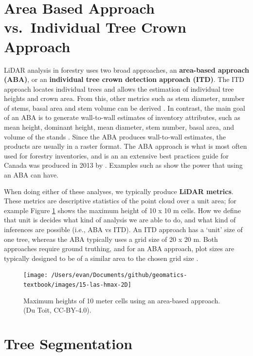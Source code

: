 \documentclass[
]{book}
\begin{document}
\hypertarget{area-based-approach-vs.-individual-tree-crown-approach}{%
\section{Area Based Approach vs.~Individual Tree Crown Approach}\label{area-based-approach-vs.-individual-tree-crown-approach}}

LiDAR analysis in forestry uses two broad approaches, an \textbf{area-based approach (ABA)}, or an \textbf{individual tree crown detection approach (ITD)}. The ITD approach locates individual trees and allows the estimation of individual tree heights and crown area. From this, other metrics such as stem diameter, number of stems, basal area and stem volume can be derived \citep{Hyyppa1999}. In contrast, the main goal of an ABA is to generate wall-to-wall estimates of inventory attributes, such as mean height, dominant height, mean diameter, stem number, basal area, and volume of the stands \citep{Næsset2002}. Since the ABA produces wall-to-wall estimates, the products are usually in a raster format. The ABA approach is what is most often used for forestry inventories, and is an an extensive best practices guide for Canada was produced in 2013 by \citet{White2013}. Examples such as \citet{Tompalski2019} show the power that using an ABA can have.

When doing either of these analyses, we typically produce \textbf{LiDAR metrics}. These metrics are descriptive statistics of the point cloud over a unit area; for example Figure \ref{fig:15-las-hmax-2D} shows the maximum height of 10 x 10 m cells. How we define that unit is decides what kind of analysis we are able to do, and what kind of inferences are possible (i.e., ABA vs ITD). An ITD approach has a `unit' size of one tree, whereas the ABA typically uses a grid size of 20 x 20 m. Both approaches require ground truthing, and for an ABA approach, plot sizes are typically designed to be of a similar area to the chosen grid size \citep{White2013}.

\begin{figure}
\texttt{[image: /Users/evan/Documents/github/geomatics-textbook/images/15-las-hmax-2D]} \caption{Maximum heights of 10 meter cells using an area-based approach. (Du Toit, CC-BY-4.0).}\label{fig:15-las-hmax-2D}
\end{figure}

\hypertarget{tree-segmentation}{%
\section{Tree Segmentation}\label{tree-segmentation}}
\end{document}

